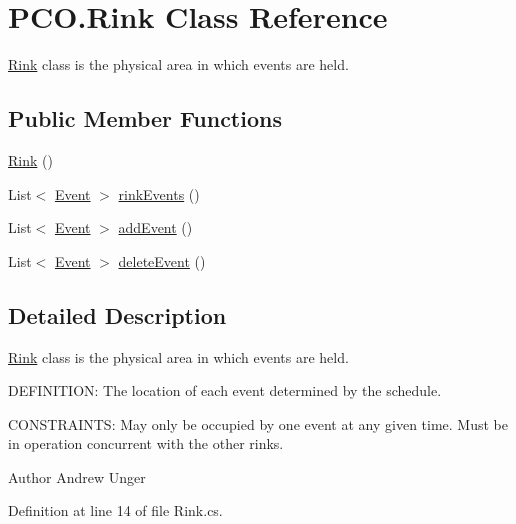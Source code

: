 \hypertarget{classPCO_1_1Rink}{\section{P\+C\+O.\+Rink Class Reference}
\label{classPCO_1_1Rink}
}


\hyperlink{classPCO_1_1Rink}{Rink} class is the physical area in which events are held.  


\subsection*{Public Member Functions}
\begin{DoxyCompactItemize}
\item 
\hyperlink{classPCO_1_1Rink_ac0a83730147b9a04f26b0c41e5337be7}{Rink} ()
\item 
List$<$ \hyperlink{classPCO_1_1Event}{Event} $>$ \hyperlink{classPCO_1_1Rink_a683b279845f595abf88cc73f87e7f691}{rink\+Events} ()
\item 
List$<$ \hyperlink{classPCO_1_1Event}{Event} $>$ \hyperlink{classPCO_1_1Rink_a9c9ba575a6f1a1ee5df1283022f93317}{add\+Event} ()
\item 
List$<$ \hyperlink{classPCO_1_1Event}{Event} $>$ \hyperlink{classPCO_1_1Rink_a950e65a75cee57ec112969dc7fa59ac4}{delete\+Event} ()
\end{DoxyCompactItemize}


\subsection{Detailed Description}
\hyperlink{classPCO_1_1Rink}{Rink} class is the physical area in which events are held. 

D\+E\+F\+I\+N\+I\+T\+I\+O\+N\+: The location of each event determined by the schedule.

C\+O\+N\+S\+T\+R\+A\+I\+N\+T\+S\+: May only be occupied by one event at any given time. Must be in operation concurrent with the other rinks.\begin{DoxyAuthor}{Author}
Andrew Unger 
\end{DoxyAuthor}


Definition at line 14 of file Rink.\+cs.



